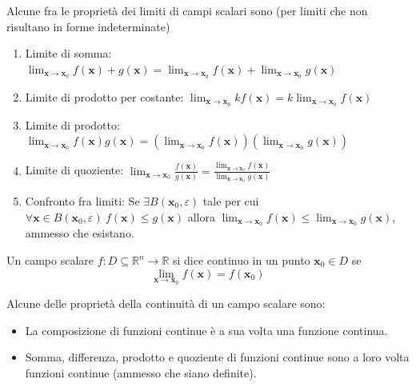             Alcune fra le proprietà dei limiti di campi scalari sono (per limiti che non risultano in forme indeterminate)
            \begin{enumerate}[label=(\arabic*)]
                \item Limite di somma: $\displaystyle \lim_{\mathbf{x} \rightarrow \mathbf{x}_0} f(\mathbf{x}) + g(\mathbf{x}) = \lim_{\mathbf{x} \rightarrow \mathbf{x}_0} f(\mathbf{x}) + \lim_{\mathbf{x} \rightarrow \mathbf{x}_0} g(\mathbf{x})$
                \item Limite di prodotto per costante: $\displaystyle \lim_{\mathbf{x} \rightarrow \mathbf{x}_0} kf(\mathbf{x}) = k\lim_{\mathbf{x} \rightarrow \mathbf{x}_0} f(\mathbf{x})$
                \item Limite di prodotto: $\displaystyle \lim_{\mathbf{x} \rightarrow \mathbf{x}_0} f(\mathbf{x})g(\mathbf{x}) = (\lim_{\mathbf{x} \rightarrow \mathbf{x}_0} f(\mathbf{x})) (\lim_{\mathbf{x} \rightarrow \mathbf{x}_0} g(\mathbf{x}))$
                \item Limite di quoziente: $\displaystyle \lim_{\mathbf{x} \rightarrow \mathbf{x}_0} \frac{f(\mathbf{x})}{g(\mathbf{x})} = \frac{\lim_{\mathbf{x} \rightarrow \mathbf{x}_0} f(\mathbf{x})} {\lim_{\mathbf{x} \rightarrow \mathbf{x}_0} g(\mathbf{x})}$
                \item Confronto fra limiti: Se $\exists B(\mathbf{x}_0, \varepsilon)$ tale per cui $\forall \mathbf{x} \in B(\mathbf{x}_0, \varepsilon) \: f(\mathbf{x}) \leq g(\mathbf{x})$ allora $\displaystyle \lim_{\mathbf{x} \rightarrow \mathbf{x}_0} f(\mathbf{x}) \leq \lim_{\mathbf{x} \rightarrow \mathbf{x}_0} g(\mathbf{x})$, ammesso che esistano.
            \end{enumerate}

            Un campo scalare $f: D \subseteq \mathbb{R}^{n} \rightarrow \mathbb{R}$ si dice continuo in un punto $\mathbf{x}_0 \in D$ se
            \[
                \lim_{\mathbf{x} \rightarrow \mathbf{x}_0} f(\mathbf{x}) = f(\mathbf{x}_0)
            \]

            Alcune delle proprietà della continuità di un campo scalare sono:
            \begin{itemize}
                \item La composizione di funzioni continue è a sua volta una funzione continua.
                \item Somma, differenza, prodotto e quoziente di funzioni continue sono a loro volta funzioni continue (ammesso che siano definite).
            \end{itemize}


